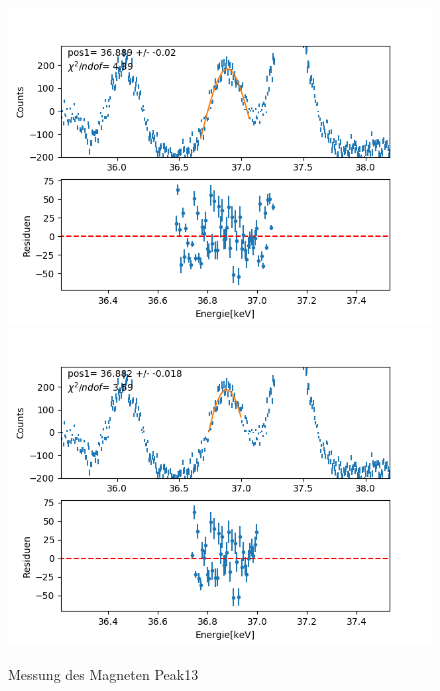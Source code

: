 \documentclass[12pt,a4paper]{article}
\begin{document}
\begin{figure}[H]
\centering
\includegraphics[scale=0.49]{Bilder/roentgen_spektren/magnet/mag13_1.png}
\includegraphics[scale=0.49]{Bilder/roentgen_spektren/magnet/mag13_2.png}
\caption{Messung des Magneten Peak13}
\end{figure}
\end{document}
